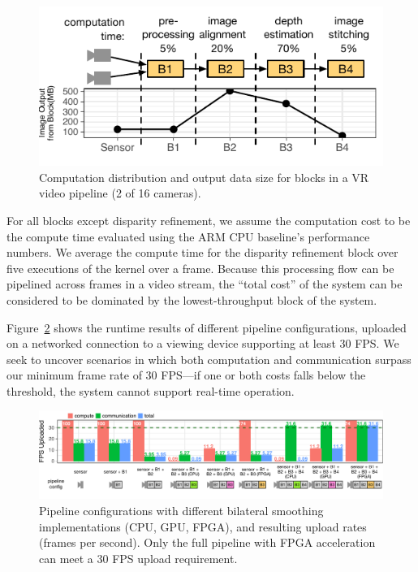 \begin{figure}[h]
\centering
    \begin{center}
\includegraphics[width=.48\textwidth]{nsp-figs/vr_input_data.pdf}
    \end{center}
    \caption{Computation distribution and output data size for blocks in a VR video pipeline (2 of 16 cameras). }
    \label{fig:vr-data-scale}
\end{figure}

For all blocks except disparity refinement, we assume the computation cost to be the compute time evaluated using the ARM CPU baseline's performance numbers. We average the compute time for the disparity refinement block over five executions of the kernel over a frame. Because this processing flow can be pipelined across frames in a video stream, the ``total cost'' of the system can be considered to be dominated by the lowest-throughput block of the system.

Figure~\ref{fig:vr-fps} shows the runtime results of different pipeline configurations, uploaded on a networked connection to a viewing device supporting at least 30 FPS. We seek to uncover scenarios in which both computation and communication surpass our minimum frame rate of 30 FPS---if one or both costs falls below the threshold, the system cannot support real-time operation.

\begin{figure}[h]
\centering
    \begin{center}
\includegraphics[width=1.0\textwidth]{nsp-figs/vr_compute_transfer.pdf}
    \end{center}
    \caption{Pipeline configurations with different bilateral smoothing implementations (CPU, GPU, FPGA), and resulting upload rates (frames per second). Only the full pipeline with FPGA acceleration can meet a 30 FPS upload requirement.}
    \label{fig:vr-fps}
\end{figure}



